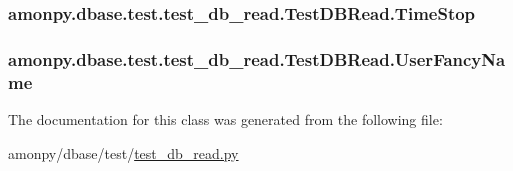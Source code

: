 \hypertarget{classamonpy_1_1dbase_1_1test_1_1test__db__read_1_1_test_d_b_read_a3ee527a724daeb372b8fe60472ba5ce4}{
\subsubsection[{Time\-Stop}]{\setlength{\rightskip}{0pt plus 5cm}amonpy.\-dbase.\-test.\-test\-\_\-db\-\_\-read.\-Test\-D\-B\-Read.\-Time\-Stop}}\label{classamonpy_1_1dbase_1_1test_1_1test__db__read_1_1_test_d_b_read_a3ee527a724daeb372b8fe60472ba5ce4}
\hypertarget{classamonpy_1_1dbase_1_1test_1_1test__db__read_1_1_test_d_b_read_a9ed55e19e8187469a496695884509101}{
\subsubsection[{User\-Fancy\-Name}]{\setlength{\rightskip}{0pt plus 5cm}amonpy.\-dbase.\-test.\-test\-\_\-db\-\_\-read.\-Test\-D\-B\-Read.\-User\-Fancy\-Name}}\label{classamonpy_1_1dbase_1_1test_1_1test__db__read_1_1_test_d_b_read_a9ed55e19e8187469a496695884509101}


The documentation for this class was generated from the following file\-:\begin{DoxyCompactItemize}
\item 
amonpy/dbase/test/\hyperlink{test__db__read_8py}{test\-\_\-db\-\_\-read.\-py}\end{DoxyCompactItemize}
